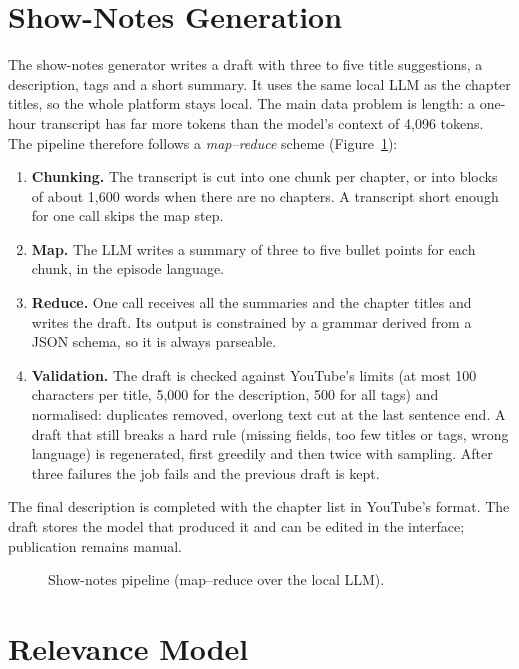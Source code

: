 \section{Show-Notes Generation}

The show-notes generator writes a draft with three to five title suggestions, a description, tags and a short summary. It uses the same local LLM as the chapter titles, so the whole platform stays local. The main data problem is length: a one-hour transcript has far more tokens than the model's context of 4{,}096 tokens. The pipeline therefore follows a \textit{map--reduce} scheme (Figure~\ref{fig:shownotes}):
\begin{enumerate}
\item \textbf{Chunking.} The transcript is cut into one chunk per chapter, or into blocks of about 1{,}600 words when there are no chapters. A transcript short enough for one call skips the map step.
\item \textbf{Map.} The LLM writes a summary of three to five bullet points for each chunk, in the episode language.
\item \textbf{Reduce.} One call receives all the summaries and the chapter titles and writes the draft. Its output is constrained by a grammar derived from a JSON schema, so it is always parseable.
\item \textbf{Validation.} The draft is checked against YouTube's limits (at most 100 characters per title, 5{,}000 for the description, 500 for all tags) and normalised: duplicates removed, overlong text cut at the last sentence end. A draft that still breaks a hard rule (missing fields, too few titles or tags, wrong language) is regenerated, first greedily and then twice with sampling. After three failures the job fails and the previous draft is kept.
\end{enumerate}
The final description is completed with the chapter list in YouTube's format. The draft stores the model that produced it and can be edited in the interface; publication remains manual.

\begin{figure}[H]
\centering
{}
\caption{Show-notes pipeline (map--reduce over the local LLM).}
\label{fig:shownotes}
\end{figure}

\section{Relevance Model}
\label{s:relevance}

